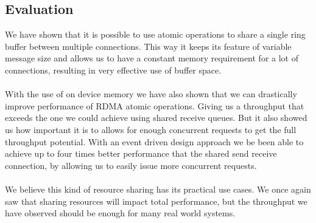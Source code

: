 \subsection{Evaluation}

We have shown that it is possible to use atomic operations to share a single ring buffer between multiple connections. This
way it keeps its feature of variable message size and allows us to have a constant memory requirement for a lot of connections,
resulting in very effective use of buffer space.

\paragraph{} With the use of on device memory we have also shown that we can drastically improve performance of RDMA atomic 
operations. Giving us a throughput that exceeds the one we could achieve using shared receive queues. But it 
also showed us how important it is to allows for enough concurrent requests to get the full throughput potential. 
With an event driven design approach we be been able to achieve up to four times better performance that the shared
send receive connection, by allowing us to easily issue more concurrent requests.

\paragraph{} We believe this kind of resource sharing has its practical use cases. We once again saw that sharing resources
will impact total performance, but the throughput we have observed should be enough for many real world systems. 
